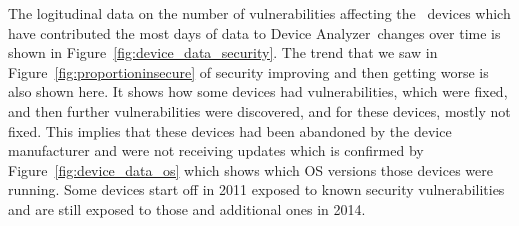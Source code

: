 \documentclass[conference,a4paper,twoside]{IEEEtran}
\newcommand{\da}{Device Analyzer}
\begin{document}
The logitudinal data on the number of vulnerabilities affecting the \daNumDeviceDataDevices\ devices which have contributed the most days of data to \da\ changes over time is shown in Figure~\ref{fig:device_data_security}.
The trend that we saw in Figure~\ref{fig:proportioninsecure} of security improving and then getting worse is also shown here.
It shows how some devices had vulnerabilities, which were fixed, and then further vulnerabilities were discovered, and for these devices, mostly not fixed.
This implies that these devices had been abandoned by the device manufacturer and were not receiving updates which is confirmed by Figure~\ref{fig:device_data_os} which shows which OS versions those devices were running.
Some devices start off in 2011 exposed to known security vulnerabilities and are still exposed to those and additional ones in 2014.
\end{document}
